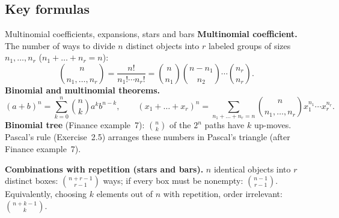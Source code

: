 \subsection*{Key formulas}

\begin{key}{Multinomial coefficients, expansions, stars and bars}
	\textbf{Multinomial coefficient.} The number of ways to divide $n$ distinct
	objects into $r$ labeled groups of sizes $n_1,\dots,n_r$
	($n_1+\dots+n_r=n$):
	\[ \binom{n}{n_1,\dots,n_r}=\frac{n!}{n_1!\cdots n_r!}
		=\binom{n}{n_1}\binom{n-n_1}{n_2}\cdots\binom{n_r}{n_r}. \]
	\textbf{Binomial and multinomial theorems.}
	\[ (a+b)^n=\sum_{k=0}^n\binom nk a^kb^{n-k},\qquad
		(x_1+\dots+x_r)^n=\sum_{n_1+\dots+n_r=n}\binom{n}{n_1,\dots,n_r}
		x_1^{n_1}\cdots x_r^{n_r}. \]
	\textbf{Binomial tree} (Finance example~7): $\binom nk$ of the $2^n$ paths
	have $k$ up-moves. Pascal's rule (Exercise~2.5) arranges these numbers in
	Pascal's triangle (after Finance example~7).

	\textbf{Combinations with repetition (stars and bars).} $n$ identical
	objects into $r$ distinct boxes: $\binom{n+r-1}{r-1}$ ways; if every box
	must be nonempty: $\binom{n-1}{r-1}$. Equivalently, choosing $k$ elements
	out of $n$ with repetition, order irrelevant: $\binom{n+k-1}{k}$.
\end{key}

